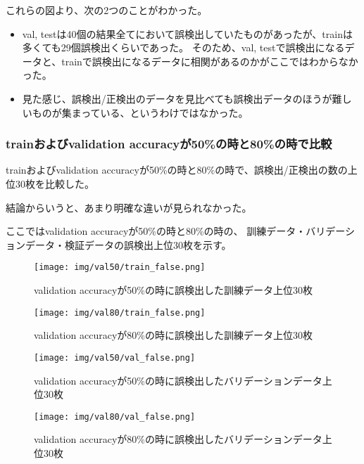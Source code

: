\documentclass[12pt]{article}
\begin{document}
これらの図より、次の2つのことがわかった。

\begin{itemize}
    \item val, testは40個の結果全てにおいて誤検出していたものがあったが、trainは多くても29個誤検出くらいであった。
    そのため、val, testで誤検出になるデータと、trainで誤検出になるデータに相関があるのかがここではわからなかった。
    \item 見た感じ、誤検出/正検出のデータを見比べても誤検出データのほうが難しいものが集まっている、というわけではなかった。
\end{itemize}

\subsubsection{trainおよびvalidation accuracyが50\%の時と80\%の時で比較}

trainおよびvalidation accuracyが50\%の時と80\%の時で、誤検出/正検出の数の上位30枚を比較した。

結論からいうと、あまり明確な違いが見られなかった。

ここではvalidation accuracyが50\%の時と80\%の時の、
訓練データ・バリデーションデータ・検証データの誤検出上位30枚を示す。

\newpage

\begin{figure}[H]
    \centering
    \texttt{[image: img/val50/train\_false.png]}
    \caption{validation accuracyが50\%の時に誤検出した訓練データ上位30枚}
\end{figure}

\begin{figure}[H]
    \centering
    \texttt{[image: img/val80/train\_false.png]}
    \caption{validation accuracyが80\%の時に誤検出した訓練データ上位30枚}
\end{figure}

\begin{figure}[H]
    \centering
    \texttt{[image: img/val50/val\_false.png]}
    \caption{validation accuracyが50\%の時に誤検出したバリデーションデータ上位30枚}
\end{figure}

\begin{figure}[H]
    \centering
    \texttt{[image: img/val80/val\_false.png]}
    \caption{validation accuracyが80\%の時に誤検出したバリデーションデータ上位30枚}
\end{figure}
\end{document}

